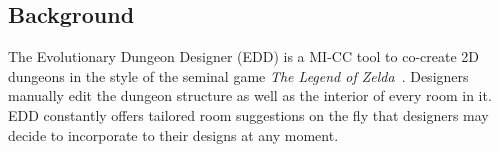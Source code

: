 \subsection{Background}





The Evolutionary Dungeon Designer (EDD) is a MI-CC tool %
to %
co-create 
2D dungeons in the style of the seminal game \emph{The Legend of Zelda}~.
Designers manually edit the dungeon structure as well as the interior of every room in it. EDD constantly offers tailored room suggestions on the fly that designers may decide to incorporate to their designs at any moment. 

